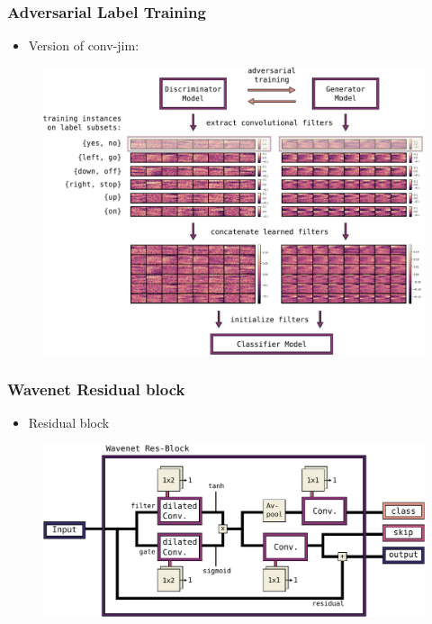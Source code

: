 \begin{frame}
  \frametitle{Adversarial Label Training}
  \begin{itemize}
    \item Version of conv-jim:
  \end{itemize}
  \begin{figure} \includegraphics[height=0.5\textheight]{../4_nn/figs/nn_adv_label_scheme.pdf} \end{figure}
\end{frame}


\begin{frame}
  \frametitle{Wavenet Residual block}
  \begin{itemize}
    \item Residual block
  \end{itemize}
  \begin{figure} \includegraphics[height=0.45\textheight]{../4_nn/figs/nn_arch_wavenet_block.pdf} \end{figure}
\end{frame}

